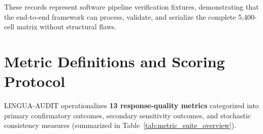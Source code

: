 \documentclass[11pt,a4paper]{article}
\begin{document}
These records represent software pipeline verification fixtures, demonstrating that the end-to-end framework can process, validate, and serialize the complete 5,400-cell matrix without structural flaws.

\section{Metric Definitions and Scoring Protocol}
\label{sec:metrics}

LINGUA-AUDIT operationalizes \textbf{13 response-quality metrics} categorized into primary confirmatory outcomes, secondary sensitivity outcomes, and stochastic consistency measures (summarized in Table~\ref{tab:metric_suite_overview}).
\end{document}
